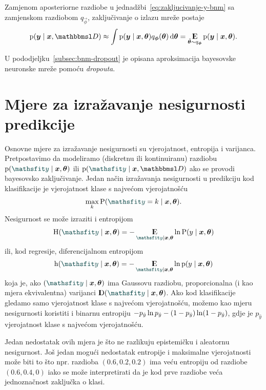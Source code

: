 \documentclass[utf8, diplomski, lmodern]{fer}
\begin{document}
Zamjenom aposteriorne razdiobe u jednadžbi~\eqref{eq:zakljucivanje-y-bnm} sa zamjenskom razdiobom $q_{\vec\phi}$, zaključivanje o izlazu mreže postaje
\begin{align} \label{eq:zakljucivanje-y-bnm-q}
\p(\vec y\mid \vec x, \set{D})
\approx \int\p(\vec y\mid \vec x,\vec\theta)q_{\vec\phi}(\vec\theta) \dif{\vec\theta}
= \E_{\tilde{\vec\theta}\sim q_{\vec\phi}}\p(\vec y\mid\vec x,\vec\theta) \text{.}
\end{align}

U pododjeljku~\ref{subsec:bnm-dropout} je opisana aproksimacija bayesovske neuronske mreže pomoću \textit{dropouta}.


\section{Mjere za izražavanje nesigurnosti predikcije} \label{sec:mjere-nesigurnosti}

Osnovne mjere za izražavanje nesigurnosti su vjerojatnost, entropija i varijanca. Pretpostavimo da modeliramo (diskretnu ili kontinuiranu) razdiobu $\p(\rvar y\mid\vec x,\vec\theta)$ ili $\p(\rvar y\mid\vec x,\set D)$ ako se provodi bayesovsko zaključivanje. Jedan način izražavanja nesigurnosti u predikciju kod klasifikacije je vjerojatnost klase s najvećom vjerojatnošću
\begin{align}
\max_k \P(\rvar y=k\mid\vec x,\vec\theta) \text{.}
\end{align}
Nesigurnost se može izraziti i entropijom
\begin{align}
\H(\rvar y\mid\vec x,\vec\theta)=-\E_{\rvar y\mid\vec x,\vec\theta}\ln\P\del{y\mid\vec x,\vec\theta}
\end{align}
ili, kod regresije, diferencijalnom entropijom
\begin{align}
\h(\rvar y\mid\vec x,\vec\theta)=-\E_{\rvar y\mid\vec x,\vec\theta}\ln\p\del{y\mid\vec x,\vec\theta}
\end{align}
koja je, ako $\del{\rvar y\mid\vec x,\vec\theta}$ ima Gaussovu razdiobu, proporcionalna (i kao mjera ekvivalentna) varijanci $\D\del{\rvar y\mid\vec x,\vec\theta}$. Ako kod klasifikacije gledamo samo vjerojatnost klase s najvećom vjerojatnošću, možemo kao mjeru nesigurnosti koristiti i binarnu entropiju $-p_{\hat{y}}\ln p_{\hat{y}}-\del{1-p_{\hat{y}}}\ln\del{1-p_{\hat{y}}}$, gdje je $p_{\hat{y}}$ vjerojatnost klase s najvećom vjerojatnošću.

Jedan nedostatak ovih mjera je što ne razlikuju epistemičku i aleatornu nesigurnost. Još jedan mogući nedostatak entropije i maksimalne vjerojatnosti može biti to što npr. razdioba $(0.6,0.2,0.2)$ ima veću entropiju od razdiobe $(0.6,0.4,0)$ iako se može interpretirati da je kod prve razdiobe veća jednoznačnost zaključka o klasi.
\end{document}
